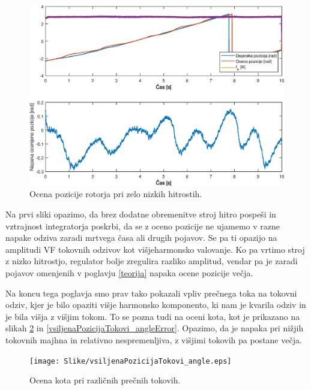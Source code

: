 \documentclass[a4paper,twoside,openright,12pt,slovene]{book}
\begin{document}
\begin{figure}[!htbp]
    \centering
    \includegraphics[width=0.8\columnwidth]{Slike/HighLoadRun.eps}
    \caption{\label{HighLoadRun} Ocena pozicije rotorja pri zelo nizkih hitrostih. }
\end{figure}

Na prvi sliki opazimo, da brez dodatne obremenitve stroj hitro pospeši in vztrajnost integratorja poskrbi, da se z oceno pozicije ne ujamemo v razne napake odziva zaradi mrtvega časa ali drugih
pojavov. Se pa ti opazijo na amplitudi VF tokovnih odzivov kot višjeharmonsko valovanje. Ko pa vrtimo stroj z nizko hitrostjo, regulator bolje zregulira razliko amplitud, vendar pa je zaradi pojavov
omenjenih v poglavju \ref{teorija} napaka ocene pozicije večja.

Na koncu tega poglavja smo prav tako pokazali vpliv prečnega toka na tokovni odziv, kjer je bilo opaziti višje harmonsko komponento, ki nam je kvarila odziv in je bila višja z višjim tokom. To se pozna
tudi na oceni kota, kot je prikazano na slikah \ref{vsiljenaPozicijaTokovi_angle} in \ref{vsiljenaPozicijaTokovi_angleError}. Opazimo, da je napaka pri nižjih tokovnih majhna in relativno
nespremenljiva, z višjimi tokovih pa postane večja. 

\begin{figure}[!htbp]
    \centering
    \texttt{[image: Slike/vsiljenaPozicijaTokovi\_angle.eps]}
    \caption{\label{vsiljenaPozicijaTokovi_angle} Ocena kota pri različnih prečnih tokovih. }
\end{figure}
\end{document}
